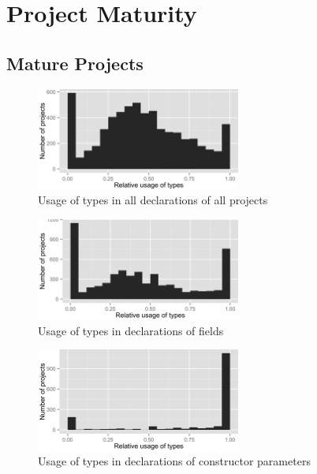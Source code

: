 \FloatBarrier
\section{Project Maturity\label{a:maturity}}

\subsection*{Mature Projects}
\begin{figure}[h]
\centering 
\includegraphics[width=0.6\textwidth]{../aosd_2014/analysis/result/script/class/histograms/5_all_types.png} 
\caption{Usage of types in all declarations of all projects}
\end{figure}

\begin{figure}[h]
\centering 
\includegraphics[width=0.6\textwidth]{../aosd_2014/analysis/result/script/class/histograms/10_Field.png} 
\caption{Usage of types in declarations of fields}
\end{figure}

\begin{figure}[h]
\centering 
\includegraphics[width=0.6\textwidth]{../aosd_2014/analysis/result/script/class/histograms/9_Constructor_Parameter.png} 
\caption{Usage of types in declarations of constructor parameters}
\end{figure}

